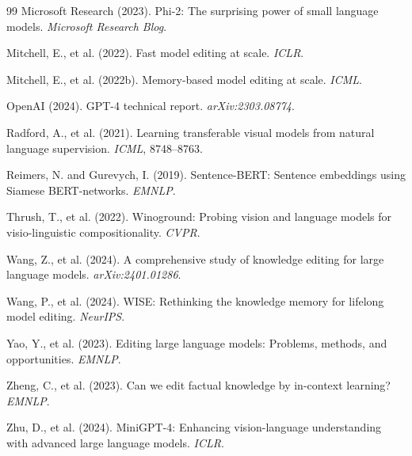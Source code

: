 \documentclass[11pt]{article}
\begin{document}
\begin{thebibliography}{99}
Microsoft Research (2023).
\newblock Phi-2: The surprising power of small language models.
\newblock \textit{Microsoft Research Blog}.

Mitchell, E., et al. (2022).
\newblock Fast model editing at scale.
\newblock \textit{ICLR}.

Mitchell, E., et al. (2022b).
\newblock Memory-based model editing at scale.
\newblock \textit{ICML}.

OpenAI (2024).
\newblock GPT-4 technical report.
\newblock \textit{arXiv:2303.08774}.

Radford, A., et al. (2021).
\newblock Learning transferable visual models from natural language supervision.
\newblock \textit{ICML}, 8748--8763.

Reimers, N. and Gurevych, I. (2019).
\newblock Sentence-BERT: Sentence embeddings using Siamese BERT-networks.
\newblock \textit{EMNLP}.

Thrush, T., et al. (2022).
\newblock Winoground: Probing vision and language models for visio-linguistic
  compositionality.
\newblock \textit{CVPR}.

Wang, Z., et al. (2024).
\newblock A comprehensive study of knowledge editing for large language models.
\newblock \textit{arXiv:2401.01286}.

Wang, P., et al. (2024).
\newblock WISE: Rethinking the knowledge memory for lifelong model editing.
\newblock \textit{NeurIPS}.

Yao, Y., et al. (2023).
\newblock Editing large language models: Problems, methods, and opportunities.
\newblock \textit{EMNLP}.

Zheng, C., et al. (2023).
\newblock Can we edit factual knowledge by in-context learning?
\newblock \textit{EMNLP}.

Zhu, D., et al. (2024).
\newblock MiniGPT-4: Enhancing vision-language understanding with advanced
  large language models.
\newblock \textit{ICLR}.

\end{thebibliography}
\end{document}
